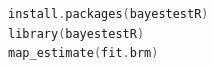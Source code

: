 \begin{lstlisting}[language=c++,label={code:27_05},caption={Displaying Results}]
install.packages(bayestestR)
library(bayestestR)
map_estimate(fit.brm)
\end{lstlisting}
